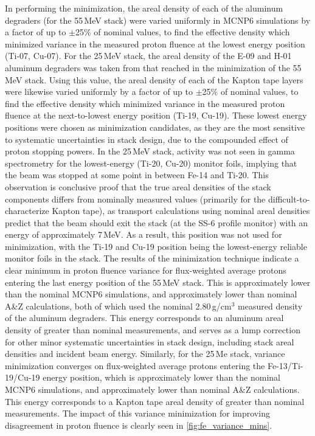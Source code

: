 In performing the  minimization, the areal density of each of the  aluminum degraders (for the 55\,MeV stack)  were varied uniformly in MCNP6 simulations  by a factor of up to $\pm$25\% of nominal values, to find the effective density which minimized variance in the measured proton fluence at the lowest energy position (Ti-07, Cu-07).
For the 25\,MeV stack, the areal density of the E-09 and H-01 aluminum degraders was taken from that reached in the minimization of the 55\,MeV stack.
Using this value, the areal density of each of the  Kapton tape  layers  were likewise varied uniformly   by a factor of up to $\pm$25\% of nominal values, to find the effective density which minimized variance in the measured proton fluence at the next-to-lowest energy position (Ti-19, Cu-19).
These lowest energy positions were chosen as  minimization candidates, as they are the most sensitive to systematic uncertainties in stack design, due to the compounded effect of proton stopping powers.
In the 25\,MeV stack, activity was not seen in gamma spectrometry for the lowest-energy (Ti-20, Cu-20) monitor foils, implying that the beam was stopped at some point in between Fe-14 and Ti-20.
This observation is conclusive proof that  the true areal densities of the stack components differs from nominally measured values (primarily for the difficult-to-characterize Kapton tape), as transport calculations using nominal areal densities predict that the beam should exit the stack (at the SS-6 profile monitor) with an energy of approximately 7\,MeV.
As a result, this position was not used for minimization, with the Ti-19 and Cu-19 position being the lowest-energy reliable monitor foils in the stack.
The results of the minimization technique indicate a clear minimum in proton fluence variance for flux-weighted average  protons entering the last energy position of the 55\,MeV stack.
This is approximately  lower than the nominal MCNP6 simulations, and approximately  lower than nominal A\&Z calculations, both of which used the nominal 2.80\,g/cm$^3$ measured density of the  aluminum degraders.
This energy corresponds to an aluminum areal density of  greater than nominal measurements, and serves as a lump correction for other minor systematic uncertainties in stack design, including stack areal densities and incident beam energy.
Similarly, for the 25\,Me stack, variance minimization converges on  flux-weighted average  protons entering the Fe-13/Ti-19/Cu-19 energy position, which is approximately  lower than the nominal MCNP6 simulations, and approximately  lower than nominal A\&Z calculations.
This energy corresponds to a Kapton tape areal density of  greater than nominal measurements.
The impact of this variance minimization for improving disagreement in proton fluence is  clearly  seen in   \autoref{fig:fe_variance_mins}.




